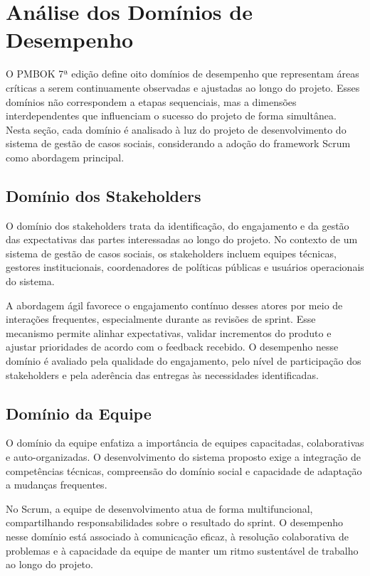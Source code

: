 \chapter{Análise dos Domínios de Desempenho}\label{chp:DominiosDesempenho}

O PMBOK 7ª edição define oito domínios de desempenho que representam áreas críticas a serem continuamente observadas e ajustadas ao longo do projeto. Esses domínios não correspondem a etapas sequenciais, mas a dimensões interdependentes que influenciam o sucesso do projeto de forma simultânea. Nesta seção, cada domínio é analisado à luz do projeto de desenvolvimento do sistema de gestão de casos sociais, considerando a adoção do framework Scrum como abordagem principal.

\section{Domínio dos Stakeholders}

O domínio dos stakeholders trata da identificação, do engajamento e da gestão das expectativas das partes interessadas ao longo do projeto. No contexto de um sistema de gestão de casos sociais, os stakeholders incluem equipes técnicas, gestores institucionais, coordenadores de políticas públicas e usuários operacionais do sistema.

A abordagem ágil favorece o engajamento contínuo desses atores por meio de interações frequentes, especialmente durante as revisões de sprint. Esse mecanismo permite alinhar expectativas, validar incrementos do produto e ajustar prioridades de acordo com o feedback recebido. O desempenho nesse domínio é avaliado pela qualidade do engajamento, pelo nível de participação dos stakeholders e pela aderência das entregas às necessidades identificadas.

\section{Domínio da Equipe}

O domínio da equipe enfatiza a importância de equipes capacitadas, colaborativas e auto-organizadas. O desenvolvimento do sistema proposto exige a integração de competências técnicas, compreensão do domínio social e capacidade de adaptação a mudanças frequentes.

No Scrum, a equipe de desenvolvimento atua de forma multifuncional, compartilhando responsabilidades sobre o resultado do sprint. O desempenho nesse domínio está associado à comunicação eficaz, à resolução colaborativa de problemas e à capacidade da equipe de manter um ritmo sustentável de trabalho ao longo do projeto.

